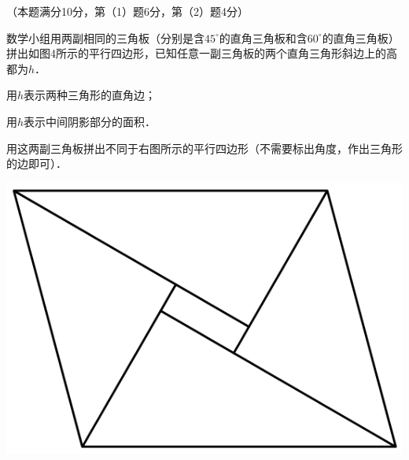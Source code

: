 \documentclass{article}
\begin{document}
\begin{question}[22]
    \item （本题满分10分，第（1）题6分，第（2）题4分）\\
    \begin{minipage}[t]{.6\textwidth}
        数学小组用两副相同的三角板（分别是含$45^\circ$的直角三角板和含$60^\circ$的直角三角板）
        拼出如图4所示的平行四边形，已知任意一副三角板的两个直角三角形斜边上的高都为$h$．
        \begin{squestion}
            \item \begin{ssquestion}
                \item 用$h$表示两种三角形的直角边；
                \item 用$h$表示中间阴影部分的面积．
            \end{ssquestion}
            \item 用这两副三角板拼出不同于右图所示的平行四边形（不需要标出角度，作出三角形的边即可）．
        \end{squestion}
    \end{minipage}
    \begin{minipage}[t]{.4\textwidth}
        \centering
        \vspace{-2ex}
        \includegraphics[scale=0.25]{images/p4.png}
    \end{minipage}
\end{question} \leavevmode \\
\end{document}
